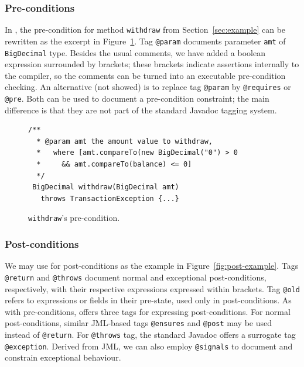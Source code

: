 \subsubsection{Pre-conditions}
In \contractjdoc, the pre-condition for method \lstinline!withdraw! from Section~\ref{sec:example} can be rewritten as the excerpt in Figure~\ref{fig:pre-example}.
Tag \lstinline!@param! documents parameter \lstinline!amt! of \lstinline!BigDecimal! type.
Besides the usual comments, we have added a boolean expression
surrounded by brackets; these brackets indicate assertions internally to the \contractjdoc{} compiler, so the comments can be turned into an executable pre-condition checking.
An alternative (not showed) is to replace tag \lstinline!@param! by \lstinline!@requires! or \lstinline!@pre!. Both can be used to document a pre-condition constraint; the main difference is that they are not part of the standard Javadoc tagging system.

\begin{figure}
\centering
\begin{lstlisting}[basicstyle=\footnotesize\ttfamily,name=figxpi, frame=lines, mathescape=true]
 /**
  * @param amt the amount value to withdraw, 
  *   where [amt.compareTo(new BigDecimal("0") > 0 
  *     && amt.compareTo(balance) <= 0]
  */
 BigDecimal withdraw(BigDecimal amt) 
   throws TransactionException {...}
\end{lstlisting}
\caption{\texttt{withdraw}'s pre-condition.}
\label{fig:pre-example}
\end{figure}


\subsubsection{Post-conditions}

We may use \contractjdoc{} for post-conditions as the example in Figure~\ref{fig:post-example}.
Tags \lstinline!@return! and \lstinline!@throws! document normal and exceptional post-conditions, respectively, with their respective expressions
expressed within brackets.
Tag \lstinline!@old! refers to expressions or fields in their pre-state, used only in post-conditions.
As with pre-conditions, \contractjdoc{} offers three tags for expressing post-conditions.
For normal post-conditions, similar JML-based tags \lstinline!@ensures! and \lstinline!@post! may be used instead of \lstinline!@return!.
For \lstinline!@throws! tag, the standard Javadoc offers a surrogate tag \lstinline!@exception!. 
Derived from JML, we can also employ \lstinline!@signals! to document and constrain exceptional behaviour.



